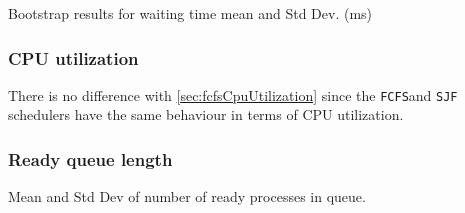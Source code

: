 \begin{table}[H]
    \centering
    \scriptsize
    
    \caption{Bootstrap results for waiting time mean and Std Dev. (ms)}
    \label{tab:sjfWait}
\end{table}


\subsubsection{CPU utilization}

There is no difference with \cref{sec:fcfsCpuUtilization} since the \texttt{FCFS}and \texttt{SJF} schedulers have the same behaviour in terms of CPU utilization.

\subsubsection{Ready queue length}

\begin{table}[H]
    \centering
    \scriptsize
    
    \caption{Mean and Std Dev of number of ready processes in queue.}
    \label{tab:sjfReadyProc}
\end{table}
